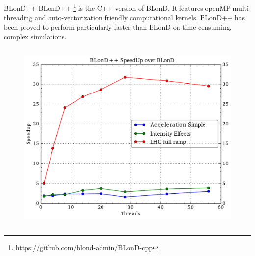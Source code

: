\begin{frame}
	\begin{block}{BLonD++}
	BLonD++ \footnote{https://github.com/blond-admin/BLonD-cpp} is the C++ version of BLonD. It features openMP multi-threading and auto-vectorization friendly computational kernels. BLonD++ has been proved to perform particularly faster than BLonD on time-consuming, complex simulations.
	\end{block}

	\begin{block}{}
	
	\begin{columns}[t]
		\vspace{-1.4cm}
		\begin{figure}
			\includegraphics[width=\textwidth]{figures/BLonDpp-speedup2}
		\end{figure}
		

\end{columns}
\end{block}
\end{frame}
